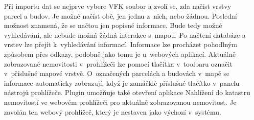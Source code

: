 \documentclass[a4paper,10pt]{article}
\begin{document}
Při importu dat se nejprve vybere VFK soubor a zvolí se, zda načíst vrstvy parcel a budov.
Je možné načíst obě, jen jednu z~nich, nebo žádnou.
Poslední možnost znamená, že se načtou jen popisné informace.
Bude tedy možné vyhledávání, ale nebude možná žádná interakce s~mapou.
Po načtení databáze a vrstev lze přejít k~vyhledávání informací.
Informace lze procházet pohodlným způsobem přes odkazy, podobně jako tomu je u~webových aplikací.
Aktuálně zobrazované nemovitosti v~prohlížeči lze pomocí tlačítka v~toolbaru označit v~příslušné mapové vrstvě.
O~označených parcelách a budovách v~mapě se informace automaticky zobrazují, když je zamáčklé příslušné tlačítko v~panelu nástrojů prohlížeče.
Plugin umožňuje také otevření aplikace Nahlížení do katastru nemovitostí ve webovém prohlížeči pro aktuálně zobrazovanou nemovitost.
Je zavolán ten webový prohlížeč, který je nestaven jako výchozí v~systému.
\end{document}
